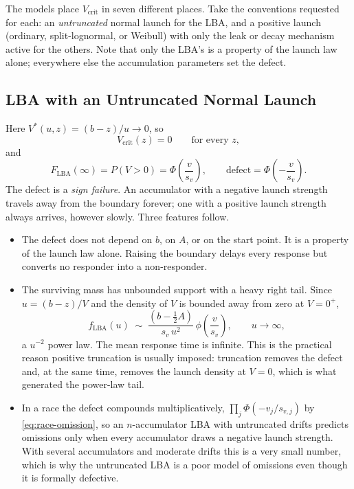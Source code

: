 \documentclass[12pt]{article}
\newcommand{\PhiN}{\Phi}
\newcommand{\phiN}{\phi}
\theoremstyle{remark}
\begin{document}
The models place $V_{\mathrm{crit}}$ in seven different places. Take the conventions requested for each: an \emph{untruncated} normal launch for the LBA, and a positive launch (ordinary, split-lognormal, or Weibull) with only the leak or decay mechanism active for the others. Note that only the LBA's is a property of the launch law alone; everywhere else the accumulation parameters set the defect.

\subsection{LBA with an Untruncated Normal Launch}
Here $V^{*}(u,z) = (b-z)/u \to 0$, so
\begin{equation}
  V_{\mathrm{crit}}(z) = 0
  \qquad\text{for every } z,
\end{equation}
and
\begin{equation}
  F_{\mathrm{LBA}}(\infty) = P(V > 0) = \PhiN\!\left(\frac{v}{s_v}\right),
  \qquad
  \text{defect} = \PhiN\!\left(-\frac{v}{s_v}\right).
  \label{eq:lba-defect}
\end{equation}
The defect is a \emph{sign failure}. An accumulator with a negative launch strength travels away from the boundary forever; one with a positive launch strength always arrives, however slowly. Three features follow.

\begin{itemize}
  \item The defect does not depend on $b$, on $A$, or on the start point. It is a property of the launch law alone. Raising the boundary delays every response but converts no responder into a non-responder.
  \item The surviving mass has unbounded support with a heavy right tail. Since $u = (b-z)/V$ and the density of $V$ is bounded away from zero at $V = 0^{+}$,
        \begin{equation}
          f_{\mathrm{LBA}}(u) \;\sim\;
          \frac{\left(b - \tfrac{1}{2}A\right)}{s_v\,u^{2}}\,
          \phiN\!\left(\frac{v}{s_v}\right),
          \qquad u \to \infty,
          \label{eq:lba-tail}
        \end{equation}
        a $u^{-2}$ power law. The mean response time is infinite. This is the practical reason positive truncation is usually imposed: truncation removes the defect and, at the same time, removes the launch density at $V = 0$, which is what generated the power-law tail.
  \item In a race the defect compounds multiplicatively, $\prod_j \PhiN(-v_j/s_{v,j})$ by \eqref{eq:race-omission}, so an $n$-accumulator LBA with untruncated drifts predicts omissions only when every accumulator draws a negative launch strength. With several accumulators and moderate drifts this is a very small number, which is why the untruncated LBA is a poor model of omissions even though it is formally defective.
\end{itemize}
\end{document}
